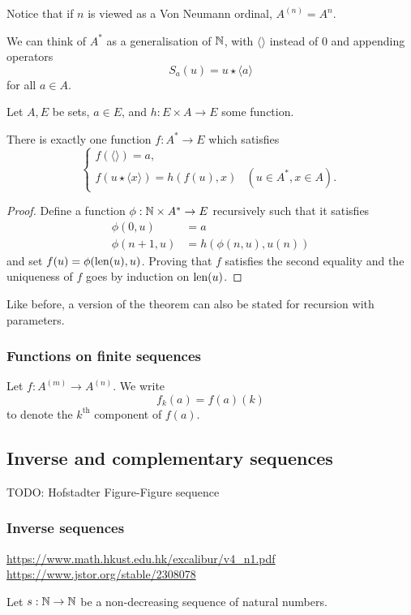 Notice that if $n$ is viewed as a Von Neumann ordinal, $A^{(n)} = A^n$.

We can think of $A^*$ as a generalisation of $\mathbb{N}$, with $\langle\rangle$ instead of $0$ and appending operators
\[ S_a(u) = u\star \langle a\rangle \]
for all $a\in A$.
\begin{theorem}
Let $A,E$ be sets, $a\in E$, and $h:E\times A\to E$ some function.

There is exactly one function $f: A^*\to E$ which satisfies
\[ \begin{cases}
f(\langle\rangle) = a, \\
f(u\star \langle x\rangle) = h(f(u), x) & (u\in A^*, x\in A).
\end{cases} \]
\end{theorem}
\begin{proof}
Define a function $\phi: \mathbb{N} \times A^*\to E$ recursively such that it satisfies
\begin{align*}
\phi(0,u) &= a \\
\phi(n+1,u) &= h(\phi(n,u), u(n))
\end{align*}
and set $f(u) = \phi(\operatorname{len}(u), u)$. Proving that $f$ satisfies the second equality and the uniqueness of $f$ goes by induction on $\operatorname{len}(u)$.
\end{proof}
Like before, a version of the theorem can also be stated for recursion with parameters.

\subsubsection{Functions on finite sequences}
Let $f: A^{(m)}\to A^{(n)}$. We write
\[ f_k(a) = f(a)(k) \]
to denote the $k^\text{th}$ component of $f(a)$.

\subsection{Inverse and complementary sequences}
TODO: Hofstadter Figure-Figure sequence
\subsubsection{Inverse sequences}
\url{https://www.math.hkust.edu.hk/excalibur/v4_n1.pdf}
\url{https://www.jstor.org/stable/2308078}
\begin{definition}
Let $s:\mathbb{N}\to\mathbb{N}$ be a non-decreasing sequence of natural numbers.
\end{definition}


